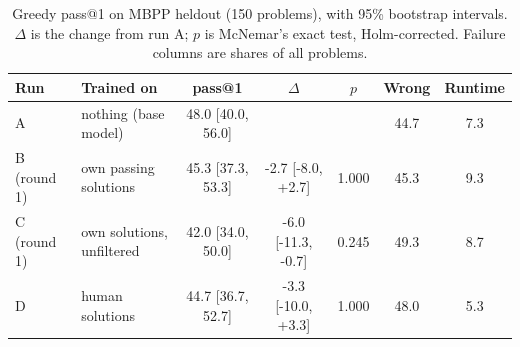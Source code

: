 \begin{table}[t]
\caption{Greedy pass@1 on MBPP heldout (150 problems), with 95\% bootstrap intervals. $\Delta$ is the change from run A; $p$ is McNemar's exact test, Holm-corrected. Failure columns are shares of all problems.}
\label{tab:results}
\centering\small
\begin{tabular}{llccccc}
\toprule
Run & Trained on & pass@1 & $\Delta$ & $p$ & Wrong & Runtime \\
\midrule
A & nothing (base model) & 48.0 [40.0, 56.0] &  &  & 44.7 & 7.3 \\
B (round 1) & own passing solutions & 45.3 [37.3, 53.3] & -2.7 [-8.0, +2.7] & 1.000 & 45.3 & 9.3 \\
C (round 1) & own solutions, unfiltered & 42.0 [34.0, 50.0] & -6.0 [-11.3, -0.7] & 0.245 & 49.3 & 8.7 \\
D & human solutions & 44.7 [36.7, 52.7] & -3.3 [-10.0, +3.3] & 1.000 & 48.0 & 5.3 \\
\bottomrule
\end{tabular}
\end{table}
